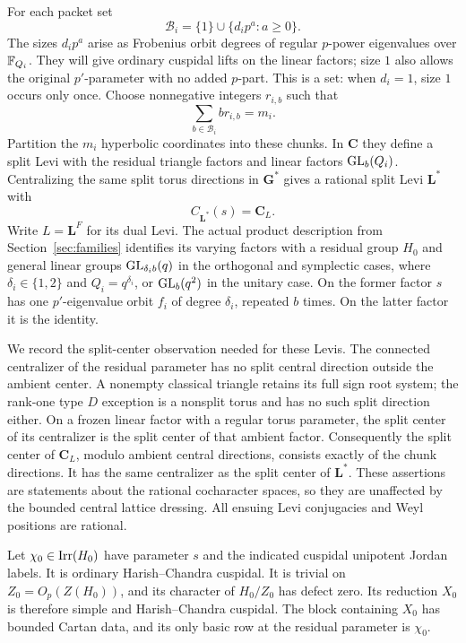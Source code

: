 For each packet set
\begin{equation}\label{end:sizes}
 \mathcal B_i=\{1\}\cup\{d_i p^a:a\geq0\}.
\end{equation}
The sizes \(d_i p^a\) arise as Frobenius orbit degrees of regular
\(p\)-power eigenvalues over \(\mathbb F_{Q_i}\).  They will give ordinary
cuspidal lifts on the linear factors; size \(1\) also allows the
original \(p'\)-parameter with no added \(p\)-part.
This is a set: when $d_i=1$, size $1$ occurs only once.  Choose
nonnegative integers $r_{i,b}$ such that
\begin{equation}\label{end:size-sum}
 \sum_{b\in\mathcal B_i}b r_{i,b}=m_i.
\end{equation}
Partition the $m_i$ hyperbolic coordinates into these chunks.  In
$\mathbf C$ they define a split Levi with the residual triangle
factors and linear factors $\operatorname{GL}_b(Q_i)$.  Centralizing the same split
torus directions in $\mathbf G^*$ gives a rational split Levi
$\mathbf L^*$ with
\[
 C_{\mathbf L^*}(s)=\mathbf C_L.
\]
Write $L=\mathbf L^F$ for its dual Levi.  The actual product
description from Section~\ref{sec:families} identifies its varying
factors with a residual group $H_0$ and general linear groups
$\operatorname{GL}_{\delta_i b}(q)$ in the orthogonal and symplectic cases, where
$\delta_i\in\{1,2\}$ and $Q_i=q^{\delta_i}$, or $\operatorname{GL}_b(q^2)$ in
the unitary case.  On the former factor $s$ has one $p'$-eigenvalue
orbit $f_i$ of degree $\delta_i$, repeated $b$ times.  On the latter
factor it is the identity.

We record the split-center observation needed for these Levis.
The connected centralizer of the residual parameter has no split
central direction outside the ambient center.  A nonempty classical
triangle retains its full sign root system; the rank-one type $D$
exception is a nonsplit torus and has no such split direction either.
On a frozen linear factor with a regular torus parameter, the split
center of its centralizer is the split center of that ambient factor.
Consequently the split center of $\mathbf C_L$, modulo ambient
central directions, consists exactly of the chunk directions.  It
has the same centralizer as the split center of $\mathbf L^*$.
These assertions are statements about the rational cocharacter
spaces, so they are unaffected by the bounded central lattice
dressing.  All ensuing Levi conjugacies and Weyl positions are
rational.

\begin{lemma}\label{end:residual}
Let $\chi_0\in\operatorname{Irr}(H_0)$ have parameter $s$ and the indicated
cuspidal unipotent Jordan labels.  It is ordinary Harish--Chandra
cuspidal.  It is trivial on $Z_0=O_p(Z(H_0))$, and its character of
$H_0/Z_0$ has defect zero.  Its reduction $X_0$ is therefore simple
and Harish--Chandra cuspidal.  The block containing $X_0$ has bounded
Cartan data, and its only basic row at the residual parameter is
$\chi_0$.
\end{lemma}

